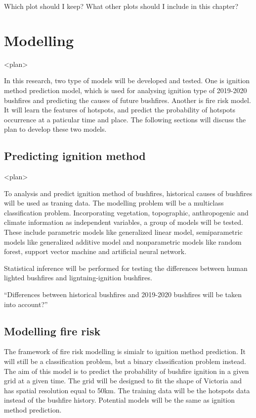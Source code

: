 \documentclass{monashthesis}
\begin{document}
Which plot should I keep? What other plots should I include in this
chapter?

\chapter{Modelling}\label{modelling}

\textless{}plan\textgreater{}

In this research, two type of models will be developed and tested. One
is ignition method prediction model, which is used for analysing
ignition type of 2019-2020 bushfires and predicting the causes of future
bushfires. Another is fire risk model. It will learn the features of
hotspots, and predict the probability of hotspots occurrence at a
paticular time and place. The following sections will discuss the plan
to develop these two models.

\section{Predicting ignition method}\label{predicting-ignition-method}

\textless{}plan\textgreater{}

To analysis and predict ignition method of bushfires, historical causes
of bushfires will be used as traning data. The modelling problem will be
a multiclass classification problem. Incorporating vegetation,
topographic, anthropogenic and climate information as independent
variables, a group of models will be tested. These include parametric
models like generalized linear model, semiparametric models like
generalized additive model and nonparametric models like random forest,
support vector machine and artificial neural network.

Statistical inference will be performed for testing the differences
between human lighted bushfires and ligntning-ignition bushfires.

``Differences between historical bushfires and 2019-2020 bushfires will
be taken into account?''

\section{Modelling fire risk}\label{modelling-fire-risk}

The framework of fire risk modelling is simialr to ignition method
prediction. It will still be a classification problem, but a binary
classification problem instead. The aim of this model is to predict the
probability of bushfire ignition in a given grid at a given time. The
grid will be designed to fit the shape of Victoria and has spatial
resolution equal to 50km. The training data will be the hotspots data
instead of the bushfire history. Potential models will be the same as
ignition method prediction.
\end{document}
